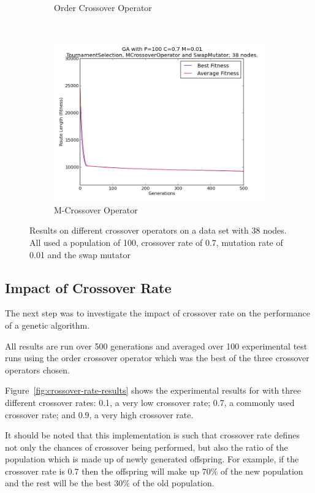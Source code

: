 \documentclass[10pt, a4paper]{article}
\begin{document}
\begin{figure}[h]
\begin{subfigure}[b]{0.67\textwidth}
\caption{Order Crossover Operator}
\end{subfigure}
~
\begin{subfigure}[b]{0.67\textwidth}
\includegraphics[width=\textwidth]{img/results/mcrossoveroperator/swapmutator/n38p100c07m001}
\caption{M-Crossover Operator}
\end{subfigure}

\caption{Results on different crossover operators on a data set with 38 nodes.
         All used a population of 100, crossover rate of 0.7, mutation rate of 
         0.01 and the swap mutator}
\label{fig:crossover-results}
\end{figure}


\subsection{Impact of Crossover Rate}
The next step was to investigate the impact of crossover rate on the 
performance of a genetic algorithm.

All results are run over 500 generations and averaged over 100 experimental 
test runs using the order crossover operator which was the best of the three
crossover operators chosen.

Figure~\ref{fig:crossover-rate-results} shows the experimental results for with
three different crossover rates: 0.1, a very low crossover rate; 0.7, a 
commonly used crossover rate; and 0.9, a very high crossover rate.

It should be noted that this implementation is such that crossover rate defines
not only the chances of crossover being performed, but also the ratio of the
population which is made up of newly generated offspring. For example, if the
crossover rate is $0.7$ then the offspring will make up $70\%$ of the new
population and the rest will be the best $30\%$ of the old population.
\end{document}
